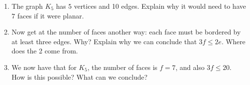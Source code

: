 \documentclass{book}
\begin{document}
\setcounter{cpjt}{27}
\addtocounter{cpjt}{-1}
\begin{activity}\label{activity-22}
\leavevmode%
\begin{enumerate}[font=\bfseries,label=(\alph*),ref=\alph*]
\item\label{task-34} \hypertarget{p-267}{}%
The graph \(K_5\) has \(5\) vertices and 10 edges.  Explain why it would need to have \(7\) faces if it were planar.%
\par\smallskip%
\noindent\item\label{task-35} \hypertarget{p-269}{}%
Now get at the number of faces another way: each face must be bordered by at least three edges.  Why?  Explain why we can conclude that \(3f \le 2e\).  Where does the 2 come from.%
\par\smallskip%
\noindent\item\label{task-36} \hypertarget{p-271}{}%
We now have that for \(K_5\), the number of faces is \(f = 7\), and also \(3f \le 20\).  How is this possible?  What can we conclude?%
\par\smallskip%
\noindent\end{enumerate}
\end{activity}

\clearpage
\end{document}
